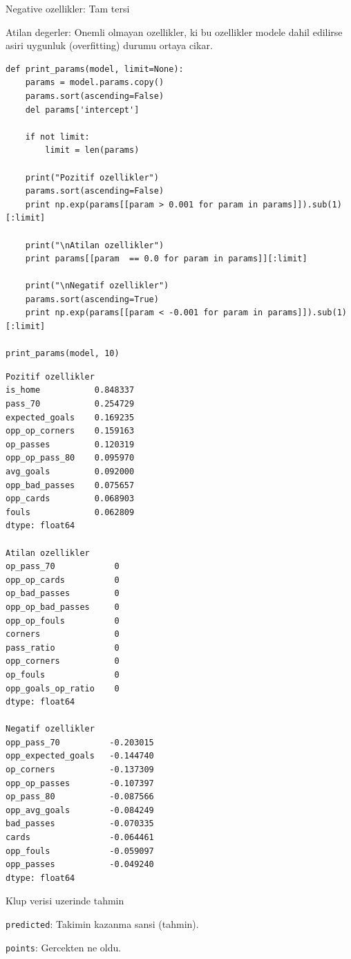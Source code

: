 \documentclass[12pt,fleqn]{article}\usepackage{../common}
\begin{document}
Negative ozellikler: Tam tersi

Atilan degerler: Onemli olmayan ozellikler, ki bu ozellikler modele dahil
edilirse asiri uygunluk (overfitting) durumu ortaya cikar. 

\begin{verbatim}
def print_params(model, limit=None):    
    params = model.params.copy()
    params.sort(ascending=False)
    del params['intercept']
    
    if not limit:
        limit = len(params)

    print("Pozitif ozellikler")
    params.sort(ascending=False)
    print np.exp(params[[param > 0.001 for param in params]]).sub(1)[:limit]

    print("\nAtilan ozellikler")
    print params[[param  == 0.0 for param in params]][:limit]

    print("\nNegatif ozellikler")
    params.sort(ascending=True)
    print np.exp(params[[param < -0.001 for param in params]]).sub(1)[:limit]

print_params(model, 10)
\end{verbatim}

\begin{verbatim}
Pozitif ozellikler
is_home           0.848337
pass_70           0.254729
expected_goals    0.169235
opp_op_corners    0.159163
op_passes         0.120319
opp_op_pass_80    0.095970
avg_goals         0.092000
opp_bad_passes    0.075657
opp_cards         0.068903
fouls             0.062809
dtype: float64

Atilan ozellikler
op_pass_70            0
opp_op_cards          0
op_bad_passes         0
opp_op_bad_passes     0
opp_op_fouls          0
corners               0
pass_ratio            0
opp_corners           0
op_fouls              0
opp_goals_op_ratio    0
dtype: float64

Negatif ozellikler
opp_pass_70          -0.203015
opp_expected_goals   -0.144740
op_corners           -0.137309
opp_op_passes        -0.107397
op_pass_80           -0.087566
opp_avg_goals        -0.084249
bad_passes           -0.070335
cards                -0.064461
opp_fouls            -0.059097
opp_passes           -0.049240
dtype: float64
\end{verbatim}

Klup verisi uzerinde tahmin

\verb!predicted!: Takimin kazanma sansi (tahmin).

\verb!points!: Gercekten ne oldu.
\end{document}
